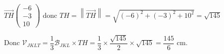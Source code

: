 \documentclass[10pt]{article}
\providecommand{\vect}[1]{\overrightarrow{#1}}
\begin{document}
\begin{enumerate}
\begin{enumerate}
\(\overrightarrow{TH}\begin{pmatrix}-6\\-3\\10\end{pmatrix}\) donc $TH= \left\|\vect{TH}\right\| = \sqrt{(-6)^2+(-3)^2+10^2}=\sqrt{145}$

Donc $\mathcal{V}_{JKLT}  = \dfrac13 \mathcal{B}_{JKL} \times TH=\dfrac13 \times \dfrac{\sqrt{145}}{2} \times \sqrt{145}= \dfrac{145}{6} $ cm.
	\end{enumerate}

\end{enumerate}
\bigskip
\end{document}
